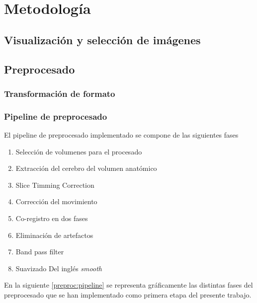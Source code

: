 \chapter{Metodología}

\section{Visualización y selección de imágenes}
\section{Preprocesado}
\subsection{Transformación de formato}

\subsection{Pipeline de preprocesado}

El pipeline de preprocesado implementado se compone de las siguientes fases

\begin{enumerate}
\item Selección de volumenes para el procesado
\item Extracción del cerebro del volumen anatómico
\item Slice Timming Correction
\item Corrección del movimiento 
\item Co-registro en dos fases
\item Eliminación de artefactos
\item Band pass filter
\item Suavizado Del inglés \textit{smooth}
\end{enumerate}

En la siguiente \ref{preproc:pipeline} se representa gráficamente las distintas fases del preprocesado que se han implementado como primera etapa del presente trabajo.

